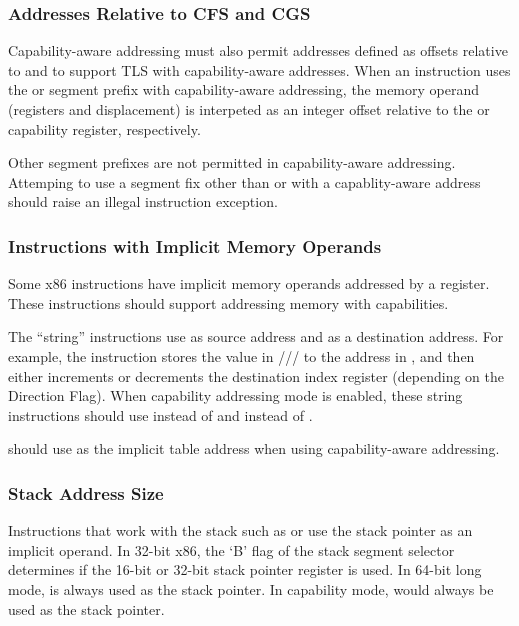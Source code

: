 \subsubsection{Addresses Relative to CFS and CGS}

Capability-aware addressing must also permit addresses defined as
offsets relative to \CFS{} and \CGS{} to support TLS with
capability-aware addresses.  When an instruction uses the \FS{} or
\GS{} segment prefix with capability-aware addressing, the memory
operand (registers and displacement) is interpeted as an integer
offset relative to the \CFS{} or \CGS{} capability register,
respectively.

Other segment prefixes are not permitted in capability-aware
addressing.  Attemping to use a segment fix other than \FS{} or
\GS{} with a capablity-aware address should raise an illegal
instruction exception.

\subsubsection{Instructions with Implicit Memory Operands}

Some x86 instructions have implicit memory operands addressed by a
register.  These instructions should support addressing memory with
capabilities.

The ``string''
instructions use \RSI{} as source address and \RDI{} as a destination address.
For example, the
 instruction stores the value in \AL{}/\AX{}/\EAX{}/\RAX{} to the address in
\RDI{}, and then either increments or decrements the destination
index register (depending on the Direction Flag).  When capability
addressing mode is enabled,
these string instructions should use \CSI{} instead of \RSI{} and \CDI{} instead of
\RDI{}.

 should use \CBX{} as the implicit table address when
using capability-aware addressing.

\subsubsection{Stack Address Size}

Instructions that work with the stack such as  or
 use the stack pointer as an implicit operand.  In
32-bit x86, the `B' flag of the stack segment selector determines if
the 16-bit or 32-bit stack pointer register is used.  In 64-bit long
mode, \RSP{} is always used as the stack pointer.  In capability mode,
\CSP{} would always be used as the stack pointer.

